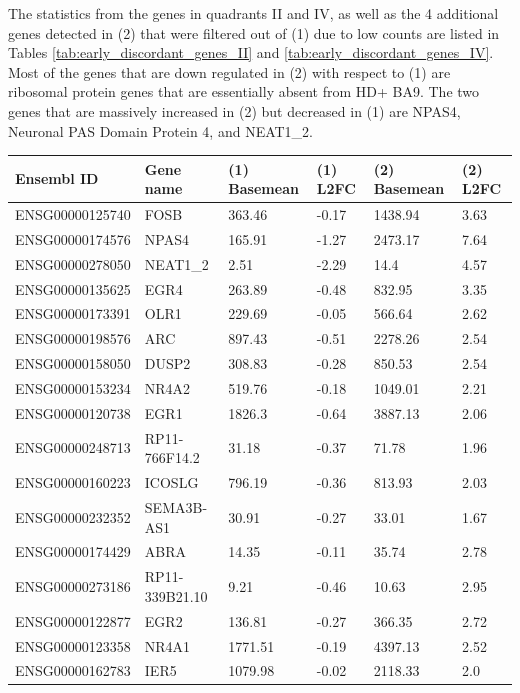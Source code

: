 \documentclass[fleqn,10pt,table]{wlscirep}
\begin{document}
The statistics from the genes in quadrants II and IV, as well as the 4 additional genes detected in (2) that were filtered out of (1) due to low counts are listed in Tables \ref{tab:early_discordant_genes_II} and \ref{tab:early_discordant_genes_IV}.
Most of the genes that are down regulated in (2) with respect to (1) are ribosomal protein genes that are essentially absent from HD+ BA9.
The two genes that are massively increased in (2) but decreased in (1) are NPAS4, Neuronal PAS Domain Protein 4, and NEAT1\_2.

\begin{table}[ht]
\centering
{}
\begin{tabular}{|l|l|l|l|l|l|} \hline
Ensembl ID & Gene name & (1) Basemean & (1) L2FC & (2) Basemean & (2) L2FC \\ \hline
ENSG00000125740 & FOSB & 363.46 & -0.17 & 1438.94 & 3.63 \\ \hline
ENSG00000174576 & NPAS4 & 165.91 & -1.27 & 2473.17 & 7.64 \\ \hline
ENSG00000278050 & NEAT1\_2 & 2.51 & -2.29 & 14.4 & 4.57 \\ \hline
ENSG00000135625 & EGR4 & 263.89 & -0.48 & 832.95 & 3.35 \\ \hline
ENSG00000173391 & OLR1 & 229.69 & -0.05 & 566.64 & 2.62 \\ \hline
ENSG00000198576 & ARC & 897.43 & -0.51 & 2278.26 & 2.54 \\ \hline
ENSG00000158050 & DUSP2 & 308.83 & -0.28 & 850.53 & 2.54 \\ \hline
ENSG00000153234 & NR4A2 & 519.76 & -0.18 & 1049.01 & 2.21 \\ \hline
ENSG00000120738 & EGR1 & 1826.3 & -0.64 & 3887.13 & 2.06 \\ \hline
ENSG00000248713 & RP11-766F14.2 & 31.18 & -0.37 & 71.78 & 1.96 \\ \hline
ENSG00000160223 & ICOSLG & 796.19 & -0.36 & 813.93 & 2.03 \\ \hline
ENSG00000232352 & SEMA3B-AS1 & 30.91 & -0.27 & 33.01 & 1.67 \\ \hline
ENSG00000174429 & ABRA & 14.35 & -0.11 & 35.74 & 2.78 \\ \hline
ENSG00000273186 & RP11-339B21.10 & 9.21 & -0.46 & 10.63 & 2.95 \\ \hline
ENSG00000122877 & EGR2 & 136.81 & -0.27 & 366.35 & 2.72 \\ \hline
ENSG00000123358 & NR4A1 & 1771.51 & -0.19 & 4397.13 & 2.52 \\ \hline
ENSG00000162783 & IER5 & 1079.98 & -0.02 & 2118.33 & 2.0 \\ \hline

\end{tabular}
\end{table}
\end{document}
